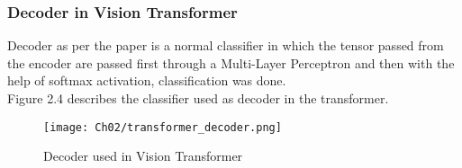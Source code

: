 \subsubsection{Decoder in Vision Transformer}
Decoder as per the paper is a normal classifier in which the tensor passed from the encoder are passed first through a Multi-Layer Perceptron and then with the help of softmax activation, classification was done.
\\
Figure 2.4 describes the classifier used as decoder in the transformer.
\begin{figure}[h]
    \centering
    \texttt{[image: Ch02/transformer\_decoder.png]}
    \caption{Decoder used in Vision Transformer}
    \label{figure:12}
\end{figure}
\FloatBarrier